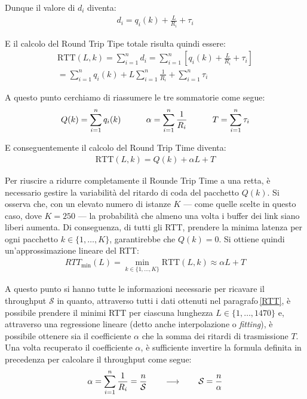 \noindent Dunque il valore di $d_i$ diventa:
\begin{gather*}
    d_i = q_i(k) + \frac{L}{R_i} + \tau_i
\end{gather*}

\noindent E il calcolo del Round Trip Tipe totale risulta quindi essere:
\begin{gather*}
    \text{RTT}(L, k) = \sum_{i = 1}^n d_i = \sum_{i = 1}^n\left[q_i(k) + \frac{L}{R_i} + \tau_i\right] \\
    = \sum_{i = 1}^n q_i(k) + L\sum_{i = 1}^n\frac{1}{R_i} + \sum_{i = 1}^n\tau_i
\end{gather*}

\noindent A questo punto cerchiamo di riassumere le tre sommatorie come segue:
\begin{gather*}
    Q(k) = \sum_{i = 1}^n q_i(k) \hspace{30px} \alpha = \sum_{i = 1}^n\frac{1}{R_i} \hspace{30px} T = \sum_{i = 1}^n\tau_i
\end{gather*}

\noindent E conseguentemente il calcolo del Round Trip Time diventa:
\begin{gather*}
    \text{RTT}(L, k) = Q(k) + \alpha L + T
\end{gather*}

\noindent Per riuscire a ridurre completamente il Rounde Trip Time a una retta, è necessario gestire la variabilità del ritardo di coda del pacchetto $Q(k)$. Si osserva che, con un elevato numero di istanze $K$ — come quelle scelte in questo caso, dove $K = 250$ — la probabilità che almeno una volta i buffer dei link siano liberi aumenta. Di conseguenza, di tutti gli RTT, prendere la minima latenza per ogni pacchetto $k \in \{1, \dots, K\}$, garantirebbe che $Q(k) = 0$. Si ottiene quindi un'approssimazione lineare del RTT\@:
\begin{gather*}
    RTT_{\text{min}}(L) = \min_{k \in \{1, \dots, K\}} \text{RTT}(L, k) \approx \alpha L + T
\end{gather*}

\noindent A questo punto si hanno tutte le informazioni necessarie per ricavare il throughput $\mathcal{S}$ in quanto, attraverso tutti i dati ottenuti nel paragrafo\,\ref{RTT}, è possibile prendere il minimi RTT per ciascuna lunghezza $L \in \{1,\dots, 1470\}$ e, attraverso una regressione lineare (detto anche interpolazione o \textsl{fitting}), è possibile ottenere sia il coefficiente $\alpha$ che la somma dei ritardi di trasmissione $T$. Una volta recuperato il coefficiente $\alpha$, è sufficiente invertire la formula definita in precedenza per calcolare il throughput come segue:
\begin{gather*}
    \alpha = \sum_{i = 1}^n\frac{1}{R_i} = \frac{n}{\mathcal{S}} \hspace{20px} \longrightarrow \hspace{20px} \mathcal{S} = \frac{n}{\alpha}
\end{gather*}

